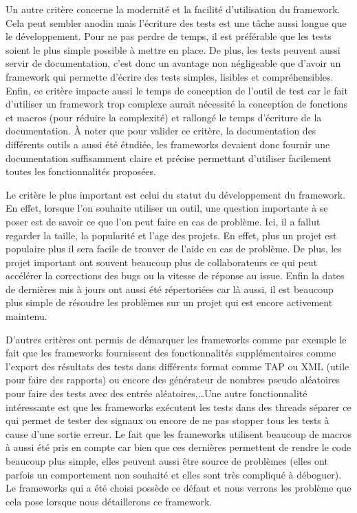 \documentclass[a4paper]{article}
\begin{document}
Un autre critère concerne la modernité et la facilité d'utilisation du
framework. Cela peut sembler anodin mais l'écriture des tests est une tâche
aussi longue que le développement. Pour ne pas perdre de temps, il est
préférable que les tests soient le plus simple possible à mettre en place. De
plus, les tests peuvent aussi servir de documentation, c'est donc un avantage
non négligeable que d'avoir un framework qui permette d'écrire des tests
simples, lisibles et compréhensibles. Enfin, ce critère impacte aussi le temps
de conception de l'outil de test car le fait d'utiliser un framework trop
complexe aurait nécessité la conception de fonctions et macros (pour réduire la
complexité) et rallongé le temps d'écriture de la documentation. À noter que
pour valider ce critère, la documentation des différents outils a aussi été
étudiée, les frameworks devaient donc fournir une documentation suffisamment
claire et précise permettant d'utiliser facilement toutes les fonctionnalités
proposées.

Le critère le plus important est celui du statut du développement du framework.
En effet, lorsque l'on souhaite utiliser un outil, une question importante à se
poser est de savoir ce que l'on peut faire en cas de problème. Ici, il a fallut
regarder la taille, la popularité et l'age des projets. En effet, plus un projet
est populaire plus il sera facile de trouver de l'aide en cas de problème. De
plus, les projet important ont souvent beaucoup plus de collaborateurs ce qui
peut accélérer la corrections des bugs ou la vitesse de réponse au issue. Enfin
la dates de dernières mis à jours ont aussi été répertoriées car là aussi, il
est beaucoup plus simple de résoudre les problèmes sur un projet qui est encore
activement maintenu.

D'autres critères ont permis de démarquer les frameworks comme par exemple le
fait que les frameworks fournissent des fonctionnalités supplémentaires comme
l'export des résultats des tests dans différents format comme TAP ou XML (utile
pour faire des rapports) ou encore des générateur de nombres pseudo aléatoires
pour faire des tests avec des entrée aléatoires,\dots Une autre fonctionnalité
intéressante est que les frameworks exécutent les tests dans des threads séparer
ce qui permet de tester des signaux ou encore de ne pas stopper tous les tests à
cause d'une sortie erreur. Le fait que les frameworks utilisent beaucoup de
macros à aussi été pris en compte car bien que ces dernières permettent de
rendre le code beaucoup plus simple, elles peuvent aussi être source de
problèmes (elles ont parfois un comportement non souhaité et elles sont très
compliqué à déboguer). Le frameworks qui a été choisi possède ce défaut et nous
verrons les problème que cela pose lorsque nous détaillerons ce framework.
\end{document}
